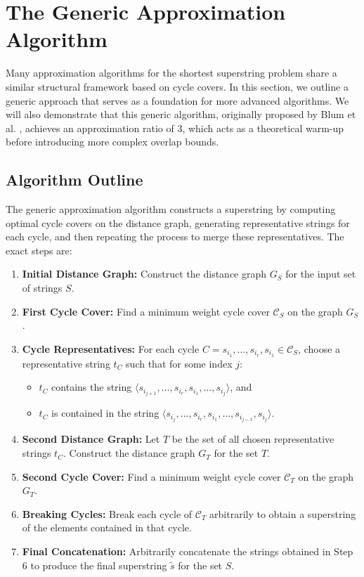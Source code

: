 \section{The Generic Approximation Algorithm}

Many approximation algorithms for the shortest superstring problem share a
similar structural framework based on cycle covers. In this section, we outline
a generic approach that serves as a foundation for more advanced algorithms. We
will also demonstrate that this generic algorithm, originally proposed by Blum
et al. \cite{blum1994linear}, achieves an approximation ratio of 3, which acts
as a theoretical warm-up before introducing more complex overlap bounds.

\subsection{Algorithm Outline}
The generic approximation algorithm constructs a superstring by computing
optimal cycle covers on the distance graph, generating representative strings
for each cycle, and then repeating the process to merge these representatives.
The exact steps are:

\begin{enumerate}
    \item \textbf{Initial Distance Graph:} Construct the distance graph $G_S$
    for the input set of strings $S$.
    \item \textbf{First Cycle Cover:} Find a minimum weight cycle cover
    $\mathcal{C}_S$ on the graph $G_S$.
    \item \textbf{Cycle Representatives:} For each cycle $C = s_{i_1}, \dots,
    s_{i_r}, s_{i_1} \in \mathcal{C}_S$, choose a representative string $t_C$
    such that for some index $j$:
    \begin{itemize}
        \item[(i)] $t_C$ contains the string $\langle s_{i_{j+1}}, \dots,
        s_{i_r}, s_{i_1}, \dots, s_{i_j} \rangle$, and
        \item[(ii)] $t_C$ is contained in the string $\langle s_{i_j}, \dots,
        s_{i_r}, s_{i_1}, \dots, s_{i_{j-1}}, s_{i_j} \rangle$.
    \end{itemize}
    \item \textbf{Second Distance Graph:} Let $T$ be the set of all chosen
    representative strings $t_C$. Construct the distance graph $G_T$ for the set
    $T$.
    \item \textbf{Second Cycle Cover:} Find a minimum weight cycle cover
    $\mathcal{C}_T$ on the graph $G_T$.
    \item \textbf{Breaking Cycles:} Break each cycle of $\mathcal{C}_T$
    arbitrarily to obtain a superstring of the elements contained in that cycle.
    \item \textbf{Final Concatenation:} Arbitrarily concatenate the strings
    obtained in Step 6 to produce the final superstring $\tilde{s}$ for the set
    $S$.
\end{enumerate}

